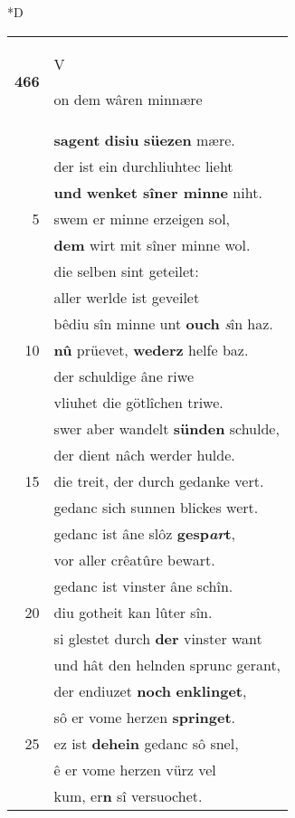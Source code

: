 \documentclass[8pt,a4paper,notitlepage]{article}
\begin{document}
\begin{table}[ht]
\begin{minipage}[t]{0.5\linewidth}
\small
\begin{center}*D
\end{center}
\begin{tabular}{rl}
\textbf{466} & \begin{large}V\end{large}on dem wâren minnære\\ 
 & \textbf{sagent} \textbf{disiu} \textbf{süezen} mære.\\ 
 & der ist ein durchliuhtec lieht\\ 
 & \textbf{und} \textbf{wenket sîner minne} niht.\\ 
5 & swem er minne erzeigen sol,\\ 
 & \textbf{dem} wirt mit sîner minne wol.\\ 
 & die selben sint geteilet:\\ 
 & aller werlde ist geveilet\\ 
 & bêdiu sîn minne unt \textbf{ouch} \textit{s}în haz.\\ 
10 & \textbf{nû} prüevet, \textbf{wederz} helfe baz.\\ 
 & der schuldige âne riwe\\ 
 & vliuhet die götlîchen triwe.\\ 
 & swer aber wandelt \textbf{sünden} schulde,\\ 
 & der dient nâch werder hulde.\\ 
15 & die treit, der durch gedanke vert.\\ 
 & gedanc sich sunnen blickes wert.\\ 
 & gedanc ist âne slôz \textbf{gesp\textit{ar}t},\\ 
 & vor aller crêatûre bewart.\\ 
 & gedanc ist vinster âne schîn.\\ 
20 & diu gotheit kan lûter sîn.\\ 
 & si glestet durch \textbf{der} vinster want\\ 
 & und hât den helnden sprunc gerant,\\ 
 & der endiuzet \textbf{noch} \textbf{enklinget},\\ 
 & sô er vome herzen \textbf{springet}.\\ 
25 & ez ist \textbf{dehein} gedanc sô snel,\\ 
 & ê er vome herzen vürz vel\\ 
 & kum, er\textbf{n} sî versuochet.\\ 

\end{tabular}
\end{minipage}
\end{table}
\end{document}
